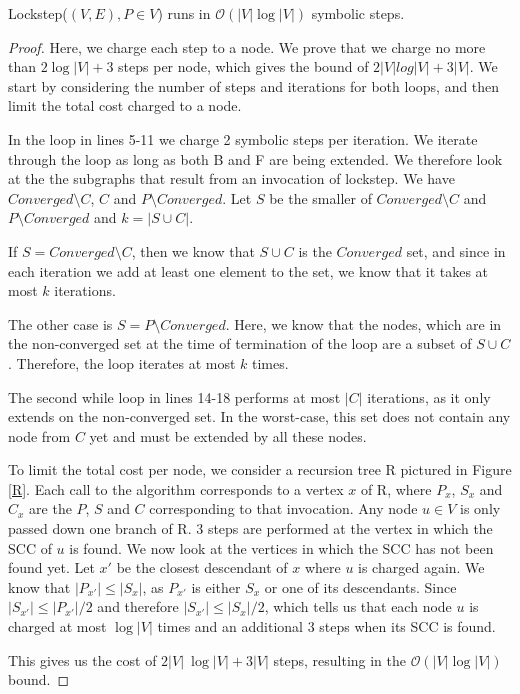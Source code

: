 \documentclass[../master/master.tex]{subfiles}
\begin{document}
\begin{theorem}\label{lockstep} Lockstep($(V, E), P\in V$) runs in $\mathcal{O}(|V|\log |V|)$ symbolic steps.
\end{theorem}
\begin{proof}
  Here, we charge each step to a node. We prove that we charge no more than $2 \log |V|+3$ steps per node, which gives the bound of $2|V|log|V|+3|V|$. We start by considering the number of steps and iterations for both loops, and then limit the total cost charged to a node.

  In the loop in lines 5-11 we charge 2 symbolic steps per iteration. We iterate through the loop as long as both B and F are being extended. We therefore look at the the subgraphs that result from an invocation of lockstep. We have $Converged\setminus C$, $C$ and $P\setminus Converged$. Let $S$ be the smaller of $Converged\setminus C$ and $P\setminus Converged$ and $k = |S\cup C|$.

  If $S = Converged\setminus C$, then we know that $S\cup C$ is the $Converged$ set, and since in each iteration we add at least one element to the set, we know that it takes at most $k$ iterations.

  The other case is $S=P\setminus Converged$. Here, we know that the nodes, which are in the non-converged set at the time of termination of the loop are a subset of $S\cup C$. Therefore, the loop iterates at most $k$ times.

  The second while loop in lines 14-18 performs at most $|C|$ iterations, as it only extends on the non-converged set. In the worst-case, this set does not contain any node from $C$ yet and must be extended by all these nodes.

  To limit the total cost per node, we consider a recursion tree R pictured in Figure \ref{R}. Each call to the algorithm corresponds to a vertex $x$ of R, where $P_x$, $S_x$ and $C_x$ are the $P$, $S$ and $C$ corresponding to that invocation. Any node $u \in V$ is only passed down one branch of R. 3 steps are performed at the vertex in which the SCC of $u$ is found. We now look at the vertices in which the SCC has not been found yet. Let $x'$ be the closest descendant of $x$ where $u$ is charged again. We know that $|P_{x'}|\leq |S_x|$, as $P_{x'}$ is either $S_x$ or one of its descendants. Since $|S_{x'}|\leq |P_{x'}|/2$ and therefore $|S_{x'}|\leq |S_{x}|/2$, which tells us that each node $u$ is charged at most $\log |V|$ times and an additional 3 steps when its SCC is found.

  This gives us the cost of $2|V|\ \log |V| + 3|V|$ steps, resulting in the $\mathcal{O}(|V|\log |V|)$ bound.
\end{proof}
\end{document}

